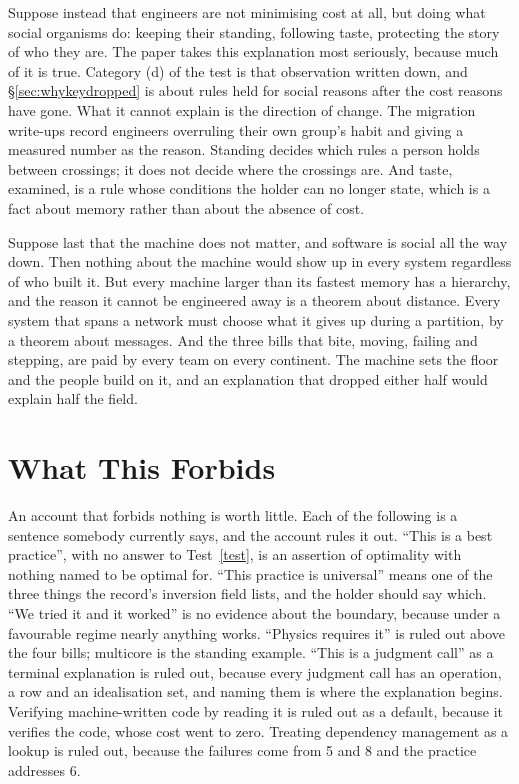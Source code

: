 \documentclass[11pt,oneside]{article}
\theoremstyle{definition}
\theoremstyle{remark}
\begin{document}
Suppose instead that engineers are not minimising cost at all, but doing what social
organisms do: keeping their standing, following taste, protecting the story of who they
are. The paper takes this explanation most seriously, because much of it is true. Category (d)
of the test is that observation written down, and \S\ref{sec:whykeydropped} is about rules
held for social reasons after the cost reasons have gone. What it cannot explain is the direction
of change. The migration write-ups record engineers overruling their own
group's habit and giving a measured number as the reason.  Standing decides
which rules a person holds between crossings; it does not decide where the crossings are.
And taste, examined, is a rule whose conditions the holder can no longer state, which is a
fact about memory rather than about the absence of cost.

Suppose last that the machine does not matter, and software is social all the way down.
Then nothing about the machine would show up in every system regardless of who built it.
But every machine larger than its fastest memory has a hierarchy, and the reason it cannot
be engineered away is a theorem about distance. Every system that spans a network must
choose what it gives up during a partition, by a theorem about messages. And the three
bills that bite, moving, failing and stepping, are paid by every team on every continent.
The machine sets the floor and the people build on it, and an explanation that dropped
either half would explain half the field.

\section{What This Forbids}\label{sec:forbids}
An account that forbids nothing is worth little. Each of the following is a sentence
somebody currently says, and the account rules it out. ``This is a best practice'', with no
answer to Test~\ref{test}, is an assertion of optimality with nothing named to be optimal
for. ``This practice is universal'' means one of the three things the record's inversion field
lists, and the holder should say which. ``We tried it
and it worked'' is no evidence about the boundary, because under a favourable regime
nearly anything works. ``Physics requires it'' is ruled out above the four bills; multicore
is the standing example. ``This is a judgment call'' as a terminal explanation is ruled
out, because every judgment call has an operation, a row and an idealisation set, and
naming them is where the explanation begins. Verifying machine-written code by reading it
is ruled out as a default, because it verifies the code, whose cost went to zero. Treating
dependency management as a lookup is ruled out, because the failures come from 5 and 8 and
the practice addresses 6.
\end{document}
